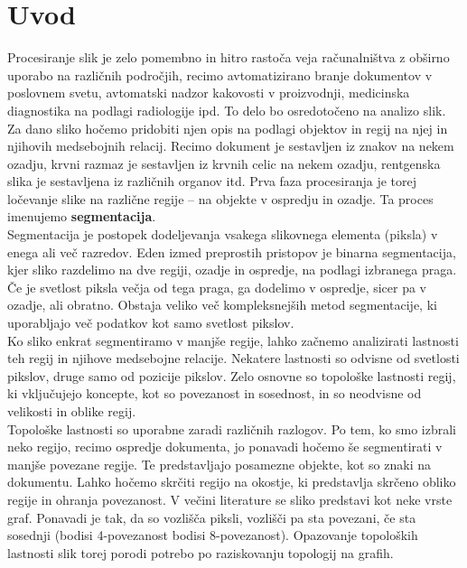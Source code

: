 \documentclass[a4paper, 12pt]{book}
\theoremstyle{definition}
\theoremstyle{remark}
\begin{document}
\chapter{Uvod}
Procesiranje slik je zelo pomembno in hitro rastoča veja računalništva z 
obširno uporabo na različnih področjih, recimo avtomatizirano branje dokumentov
v poslovnem svetu, avtomatski nadzor kakovosti v proizvodnji, medicinska diagnostika
na podlagi radiologije ipd. To delo bo osredotočeno na analizo slik.
Za dano sliko hočemo pridobiti njen opis na podlagi objektov in regij na njej
in njihovih medsebojnih relacij. Recimo dokument je sestavljen iz znakov na nekem ozadju, krvni razmaz je 
sestavljen iz krvnih celic na nekem ozadju, rentgenska slika je sestavljena
iz različnih organov itd. Prva faza procesiranja je torej ločevanje slike na
različne regije -- na objekte v ospredju in ozadje. Ta proces imenujemo \textbf{segmentacija}.\\
Segmentacija je postopek dodeljevanja vsakega slikovnega elementa (piksla) v enega ali več
razredov. Eden izmed preprostih pristopov je binarna segmentacija, kjer sliko razdelimo
na dve regiji, ozadje in ospredje, na podlagi izbranega praga. Če je svetlost piksla večja
od tega praga, ga dodelimo v ospredje, sicer pa v ozadje, ali obratno. Obstaja veliko več
kompleksnejših metod segmentacije, ki uporabljajo več podatkov kot samo svetlost
pikslov.\\
Ko sliko enkrat segmentiramo v manjše regije, lahko začnemo analizirati lastnosti
teh regij in njihove medsebojne relacije. Nekatere lastnosti so odvisne od svetlosti
pikslov, druge samo od pozicije pikslov. Zelo osnovne so topološke lastnosti
regij, ki vključujejo koncepte, kot so povezanost in sosednost, in so neodvisne od
velikosti in oblike regij.\\
Topološke lastnosti so uporabne zaradi različnih razlogov. Po tem, ko smo izbrali
neko regijo, recimo ospredje dokumenta, jo ponavadi hočemo še segmentirati v
manjše povezane regije. Te predstavljajo posamezne objekte, kot so znaki na dokumentu. Lahko
hočemo skrčiti regijo na okostje, ki predstavlja skrčeno obliko regije in ohranja
povezanost.
V večini literature se sliko predstavi kot neke vrste graf. Ponavadi je tak, da
so vozlišča piksli, vozlišči pa sta povezani, če sta sosednji (bodisi 4-povezanost
bodisi 8-povezanost). Opazovanje topoloških lastnosti slik torej porodi potrebo po
raziskovanju topologij na grafih.
\end{document}
